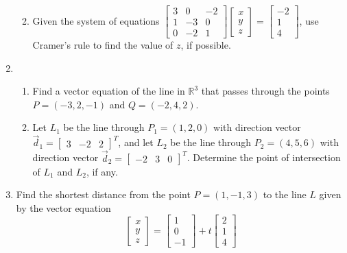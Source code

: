 \documentclass[12pt]{article}
\newcommand{\points}[1]{\marginpar{\hspace{24pt}[#1]}}
\newcommand{\R}{\mathbb{R}}
\begin{document}
\begin{enumerate}
\begin{enumerate}
\vspace{3.5in}

 \item Given the system of equations $\begin{bmatrix}3&0&-2\\1&-3&0\\0&-2&1\end{bmatrix}\begin{bmatrix}x\\y\\z\end{bmatrix} =\begin{bmatrix}-2\\1\\4\end{bmatrix}$, use Cramer's rule to find the value of $z$, if possible. \points{5}
\end{enumerate}


\newpage

\item \begin{enumerate}
       \item Find a vector equation of the line in $\R^3$ that passes through the points $P=(-3,2,-1)$ and $Q=(-2,4,2)$. \points{4}

\vspace{2.5in}

       \item Let $L_1$ be the line through $P_1=(1,2,0)$ with direction vector $\vec{d}_1 = \begin{bmatrix}3&-2&2\end{bmatrix}^T$, and let $L_2$ be the line through $P_2=(4,5,6)$ with direction vector $\vec{d}_2=\begin{bmatrix}-2&3&0\end{bmatrix}^T$. Determine the point of intersection of $L_1$ and $L_2$, if any.\points{6}
      \end{enumerate}




\newpage
\item Find the shortest distance from the point $P=(1,-1,3)$ to the line $L$ given by the vector equation \points{5}
\[
\begin{bmatrix}x\\y\\z\end{bmatrix} = \begin{bmatrix}1\\0\\-1\end{bmatrix} + t\begin{bmatrix}2\\1\\4\end{bmatrix}
\]


\end{enumerate}
\end{document}
